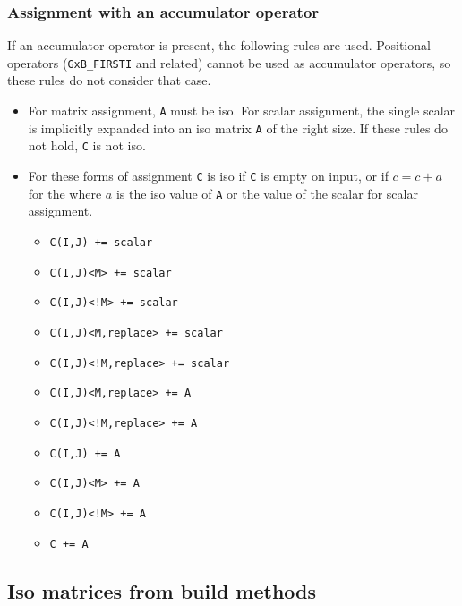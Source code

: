 \documentclass[12pt]{article}
\begin{document}
\subsubsection{Assignment with an accumulator operator}

If an accumulator operator is present, the following rules are used.
Positional operators (\verb'GxB_FIRSTI' and related) cannot be used as
accumulator operators, so these rules do not consider that case.

\begin{itemize}
\item
For matrix assignment, \verb'A' must be iso.  For scalar assignment, the single
scalar is implicitly expanded into an iso matrix \verb'A' of the right size.
If these rules do not hold, \verb'C' is not iso.

\item For these forms of assignment \verb'C' is iso if \verb'C' is
empty on input, or if $c=c+a$ for the where $a$ is the iso value of \verb'A' or
the value of the scalar for scalar assignment.

                \begin{itemize}
                \item \verb'C(I,J) += scalar'
                \item \verb'C(I,J)<M> += scalar'
                \item \verb'C(I,J)<!M> += scalar'
                \item \verb'C(I,J)<M,replace> += scalar'
                \item \verb'C(I,J)<!M,replace> += scalar'
                \item \verb'C(I,J)<M,replace> += A'
                \item \verb'C(I,J)<!M,replace> += A'
                \item \verb'C(I,J) += A'
                \item \verb'C(I,J)<M> += A'
                \item \verb'C(I,J)<!M> += A '
                \item \verb'C += A'
                \end{itemize}
\end{itemize}

\subsection{Iso matrices from build methods}
\label{iso_build}
\end{document}
